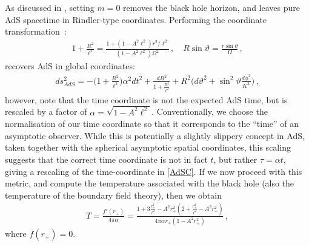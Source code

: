 \documentclass[
twoside,
openright,
frontopenright
]{dmathesis}
\begin{document}
As discussed in \cite{Appels:2017xoe,Gregory:2017ogk}, setting $m=0$ removes the
black hole horizon, and leaves pure AdS spacetime in Rindler-type coordinates.
Performing the coordinate transformation~\cite{Podolsky:2002nk}:
\begin{align}
1+\frac{R^2}{\ell^2}=\frac{1+(1-A^2\ell^2)r^2/\ell^2}{(1-A^2\ell^2)\Omega^2}\,, \quad
R\sin\vartheta=\frac{r\sin\theta}{\Omega}\,,
\end{align}
recovers AdS in global coordinates:
\begin{align}
\label{gAdS}
 ds^2_{AdS}= -\Big(1+\frac{R^2}{\ell^2}\Big) \alpha^2
dt^2+\frac{dR^2}{1+\frac{R^2}{\ell^2}}  +R^2\Big(d\vartheta^2+\sin^2\vartheta
\frac{d\phi^2}{K^2}\Big)\,,
\end{align}
however, note that the time coordinate is not the expected AdS time, but is
rescaled by a factor of $\alpha = \sqrt{1-A^2 \ell^2}$. Conventionally, we
choose the normalisation of our time coordinate so that it corresponds to
the ``time'' of an asymptotic observer. While this is potentially a slightly slippery
concept in AdS, taken together with the spherical asymptotic spatial coordinates,
this scaling suggests that the correct time coordinate is not in fact $t$, but rather
$\tau=\alpha t$, giving a rescaling of the time-coordinate in \eqref{AdSC}.
If we now proceed with this metric, and compute the temperature
associated with the black hole (also the temperature of the boundary
field theory), then we obtain
\begin{align}
T =\frac{f'(r_+)}{4\pi\alpha}
=\frac{1 + 3\frac{r_+^2}{\ell^2}
- A^2r_+^2 \left (2+\frac{r_+^2}{\ell^2}-A^2r_+^2\right)}
{4\pi \alpha r_+(1-A^2r_+^2)}\,,
\label{temp}
\end{align}
where $f(r_+)=0$.
\end{document}
